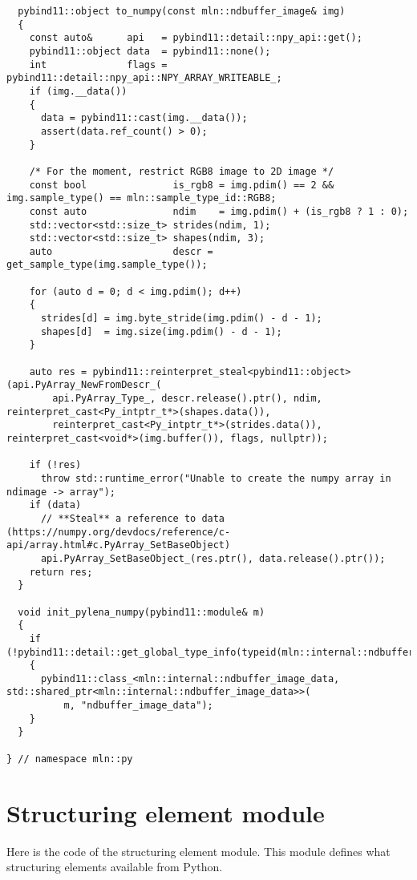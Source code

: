 \begin{verbatim}
  pybind11::object to_numpy(const mln::ndbuffer_image& img)
  {
    const auto&      api   = pybind11::detail::npy_api::get();
    pybind11::object data  = pybind11::none();
    int              flags = pybind11::detail::npy_api::NPY_ARRAY_WRITEABLE_;
    if (img.__data())
    {
      data = pybind11::cast(img.__data());
      assert(data.ref_count() > 0);
    }

    /* For the moment, restrict RGB8 image to 2D image */
    const bool               is_rgb8 = img.pdim() == 2 && img.sample_type() == mln::sample_type_id::RGB8;
    const auto               ndim    = img.pdim() + (is_rgb8 ? 1 : 0);
    std::vector<std::size_t> strides(ndim, 1);
    std::vector<std::size_t> shapes(ndim, 3);
    auto                     descr = get_sample_type(img.sample_type());

    for (auto d = 0; d < img.pdim(); d++)
    {
      strides[d] = img.byte_stride(img.pdim() - d - 1);
      shapes[d]  = img.size(img.pdim() - d - 1);
    }

    auto res = pybind11::reinterpret_steal<pybind11::object>(api.PyArray_NewFromDescr_(
        api.PyArray_Type_, descr.release().ptr(), ndim, reinterpret_cast<Py_intptr_t*>(shapes.data()),
        reinterpret_cast<Py_intptr_t*>(strides.data()), reinterpret_cast<void*>(img.buffer()), flags, nullptr));

    if (!res)
      throw std::runtime_error("Unable to create the numpy array in ndimage -> array");
    if (data)
      // **Steal** a reference to data (https://numpy.org/devdocs/reference/c-api/array.html#c.PyArray_SetBaseObject)
      api.PyArray_SetBaseObject_(res.ptr(), data.release().ptr());
    return res;
  }

  void init_pylena_numpy(pybind11::module& m)
  {
    if (!pybind11::detail::get_global_type_info(typeid(mln::internal::ndbuffer_image_data)))
    {
      pybind11::class_<mln::internal::ndbuffer_image_data, std::shared_ptr<mln::internal::ndbuffer_image_data>>(
          m, "ndbuffer_image_data");
    }
  }

} // namespace mln::py
\end{verbatim}


\clearpage

\section{Structuring element module}
\label{appendix:static-dynamic-bridge.se}

Here is the code of the structuring element module. This module defines what structuring elements available from Python.

